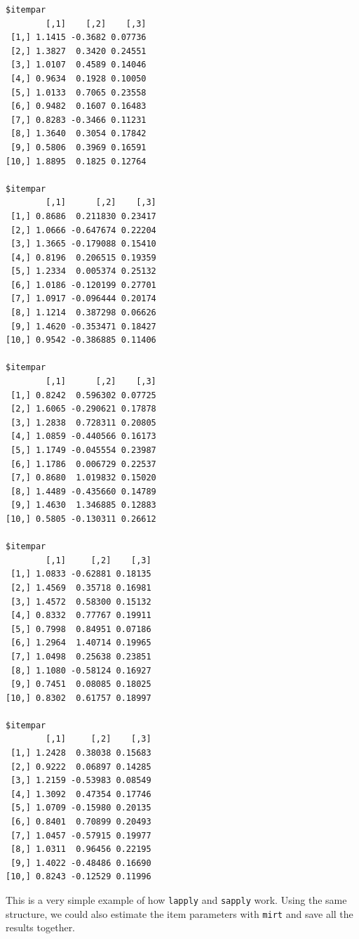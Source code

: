 \documentclass[
]{book}
\begin{document}
\begin{verbatim}
$itempar
        [,1]    [,2]    [,3]
 [1,] 1.1415 -0.3682 0.07736
 [2,] 1.3827  0.3420 0.24551
 [3,] 1.0107  0.4589 0.14046
 [4,] 0.9634  0.1928 0.10050
 [5,] 1.0133  0.7065 0.23558
 [6,] 0.9482  0.1607 0.16483
 [7,] 0.8283 -0.3466 0.11231
 [8,] 1.3640  0.3054 0.17842
 [9,] 0.5806  0.3969 0.16591
[10,] 1.8895  0.1825 0.12764

$itempar
        [,1]      [,2]    [,3]
 [1,] 0.8686  0.211830 0.23417
 [2,] 1.0666 -0.647674 0.22204
 [3,] 1.3665 -0.179088 0.15410
 [4,] 0.8196  0.206515 0.19359
 [5,] 1.2334  0.005374 0.25132
 [6,] 1.0186 -0.120199 0.27701
 [7,] 1.0917 -0.096444 0.20174
 [8,] 1.1214  0.387298 0.06626
 [9,] 1.4620 -0.353471 0.18427
[10,] 0.9542 -0.386885 0.11406

$itempar
        [,1]      [,2]    [,3]
 [1,] 0.8242  0.596302 0.07725
 [2,] 1.6065 -0.290621 0.17878
 [3,] 1.2838  0.728311 0.20805
 [4,] 1.0859 -0.440566 0.16173
 [5,] 1.1749 -0.045554 0.23987
 [6,] 1.1786  0.006729 0.22537
 [7,] 0.8680  1.019832 0.15020
 [8,] 1.4489 -0.435660 0.14789
 [9,] 1.4630  1.346885 0.12883
[10,] 0.5805 -0.130311 0.26612

$itempar
        [,1]     [,2]    [,3]
 [1,] 1.0833 -0.62881 0.18135
 [2,] 1.4569  0.35718 0.16981
 [3,] 1.4572  0.58300 0.15132
 [4,] 0.8332  0.77767 0.19911
 [5,] 0.7998  0.84951 0.07186
 [6,] 1.2964  1.40714 0.19965
 [7,] 1.0498  0.25638 0.23851
 [8,] 1.1080 -0.58124 0.16927
 [9,] 0.7451  0.08085 0.18025
[10,] 0.8302  0.61757 0.18997

$itempar
        [,1]     [,2]    [,3]
 [1,] 1.2428  0.38038 0.15683
 [2,] 0.9222  0.06897 0.14285
 [3,] 1.2159 -0.53983 0.08549
 [4,] 1.3092  0.47354 0.17746
 [5,] 1.0709 -0.15980 0.20135
 [6,] 0.8401  0.70899 0.20493
 [7,] 1.0457 -0.57915 0.19977
 [8,] 1.0311  0.96456 0.22195
 [9,] 1.4022 -0.48486 0.16690
[10,] 0.8243 -0.12529 0.11996
\end{verbatim}

This is a very simple example of how \texttt{lapply} and \texttt{sapply} work. Using the same structure, we could also estimate the item parameters with \texttt{mirt} and save all the results together.
\end{document}
